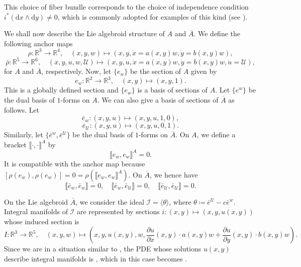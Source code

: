 \documentclass[11pt]{article}
\theoremstyle{plain}
\theoremstyle{definition}
\begin{document}
This choice of fiber bundle corresponds to the choice of independence condition $i^\ast(\mathrm{d}x\wedge \mathrm{d}y)\neq 0$, which is commonly adopted for examples of this kind (see \cite{ivey2016cartan}).

We shall now describe the Lie algebroid structure of $A$ and $\overline{A}$. We define the following anchor maps
\begin{equation*}
    \rho\colon \mathbb{R}^3\longrightarrow \mathbb{R}^4,\quad (x,y,w)\longmapsto (x,y,\dot{x}=a(x,y)w,\dot{y}=b(x,y)w),
\end{equation*}
\begin{equation*}
    \bar{\rho}\colon \mathbb{R}^5\longrightarrow \mathbb{R}^6,\quad (x,y,u,w,\mathcal{U})\longmapsto (x,y,u,\dot{x}=a(x,y)w,\dot{y}=b(x,y)w,\dot{u}=\mathcal{U}),
\end{equation*}
for $A$ and $\overline{A}$, respectively. Now, let $\{e_w\}$ be the section of $A$ given by
\begin{equation*}
    e_w\colon \mathbb{R}^2\longrightarrow \mathbb{R}^3,\quad (x,y)\longmapsto (x,y,1).
\end{equation*}
This is a globally defined section and $\{e_w\}$ is a basis of sections of $A$. Let $\{e^w\}$ be the dual basis of $1$-forms on $A$. We can also give a basis of sections of $\overline{A}$ as follows. Let
\begin{equation*}
    \bar{e}_w\colon (x,y,u)\longmapsto (x,y,u,1,0),
\end{equation*}
\begin{equation*}
    \bar{e}_{\mathcal{U}}\colon (x,y,u)\longmapsto (x,y,u,0,1).
\end{equation*}
Similarly, let $\{\bar{e}^w,\bar{e}^{\mathcal{U}}\}$ be the dual basis of $1$-forms on $\overline{A}$. On $A$, we define a bracket $\llbracket \cdot,\cdot \rrbracket^A$ by
\begin{equation*}
    \llbracket e_w,e_w \rrbracket^A=0.
\end{equation*}
It is compatible with the anchor map because $[\rho(e_w),\rho(e_w)]=0=\rho(\llbracket e_w,e_w\rrbracket^A)$. On $\overline{A}$, we hence have
\begin{equation*}
    \llbracket \bar{e}_w,\bar{e}_w\rrbracket=0,\quad \llbracket \bar{e}_w,\bar{e}_{\mathcal{U}}\rrbracket=0,\quad \llbracket \bar{e}_{\mathcal{U}},\bar{e}_{\mathcal{U}}\rrbracket=0.
\end{equation*}

On the Lie algebroid $\overline A$, we consider the ideal $\mathcal{I}=\langle \theta\rangle$, where $\theta\coloneqq \bar{e}^{\mathcal{U}}-c\bar{e}^w$. Integral manifolds of $\mathcal{I}$ are represented by sections $i\colon (x,y) \mapsto (x,y,u(x,y))$ whose induced section is
\begin{equation*}
    I\colon \mathbb{R}^3\longrightarrow \mathbb{R}^5,\quad (x,y,w)\longmapsto \left(x,y,u(x,y),w,\frac{\partial u}{\partial x}(x,y)\cdot a(x,y)w+\frac{\partial u}{\partial y}(x,y)\cdot b(x,y)w\right).
\end{equation*}
Since we are in a situation similar to , the PDE whose solutions $u(x,y)$ describe integral manifolds is , which in this case becomes .
  
\end{document}
